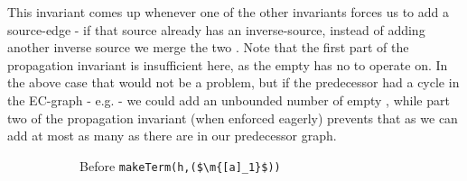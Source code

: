\noindent
This invariant comes up whenever one of the other invariants forces us to add a source-edge - if that source already has an inverse-source, instead of adding another inverse source we merge the two \GTs{}. 
Note that the first part of the propagation invariant is insufficient here, as the empty \GT{} has no \GFAs{} to operate on. In the above case that would not be a problem, but if the predecessor had a cycle in the EC-graph - e.g.  - we could add an unbounded number of empty \GTs{}, while part two of the propagation invariant (when enforced eagerly) prevents that as we can add at most as many \GTs{} as there are in our predecessor graph.

\begin{figure}
\begin{subfigure}[t]{0.49\textwidth}
\caption{
Before \lstinline|makeTerm(h,($\m{[a]_1}$))|
}
\label{snippet3.18_graph.0}
\end{subfigure}
\begin{subfigure}[t]{0.49\textwidth}
\end{subfigure}
\end{figure}
